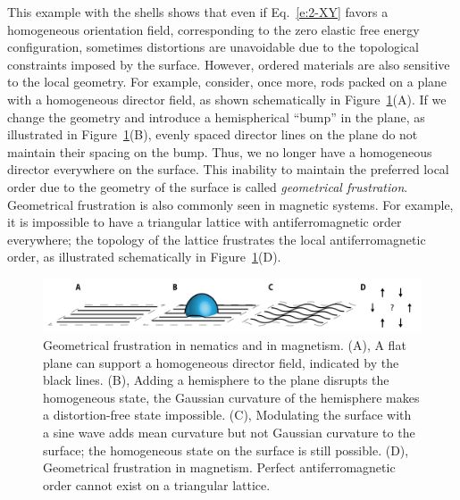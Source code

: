 This example with the shells shows that even if Eq.~\ref{e:2-XY} favors a homogeneous orientation field, corresponding to the zero elastic free energy configuration, sometimes distortions are unavoidable due to the topological constraints imposed by the surface.
However, ordered materials are also sensitive to the local geometry.
For example, consider, once more, rods packed on a plane with a homogeneous director field, as shown schematically in Figure~\ref{f:1-ParallelTransport}(A).
If we change the geometry and introduce a hemispherical ``bump'' in the plane, as illustrated in Figure~\ref{f:1-ParallelTransport}(B), evenly spaced director lines on the plane do not maintain their spacing on the bump.
Thus, we no longer have a homogeneous director everywhere on the surface.
This inability to maintain the preferred local order due to the geometry of the surface is called \emph{geometrical frustration}.
Geometrical frustration is also commonly seen in magnetic systems.
For example, it is impossible to have a triangular lattice with antiferromagnetic order everywhere; the topology of the lattice frustrates the local antiferromagnetic order, as illustrated schematically in Figure~\ref{f:1-ParallelTransport}(D).
\begin{figure}
  \centering
  \includegraphics{figures/C1/Ch1-Figs_ParallelTransport.png}
  \caption{Geometrical frustration in nematics and in magnetism.
  (A), A flat plane can support a homogeneous director field, indicated by the black lines.
  (B), Adding a hemisphere to the plane disrupts the homogeneous state, the Gaussian curvature of the hemisphere makes a distortion-free state impossible.
  (C), Modulating the surface with a sine wave adds mean curvature but not Gaussian curvature to the surface; the homogeneous state on the surface is still possible.
  (D), Geometrical frustration in magnetism. Perfect antiferromagnetic order cannot exist on a triangular lattice.}\label{f:1-ParallelTransport}
\end{figure}

